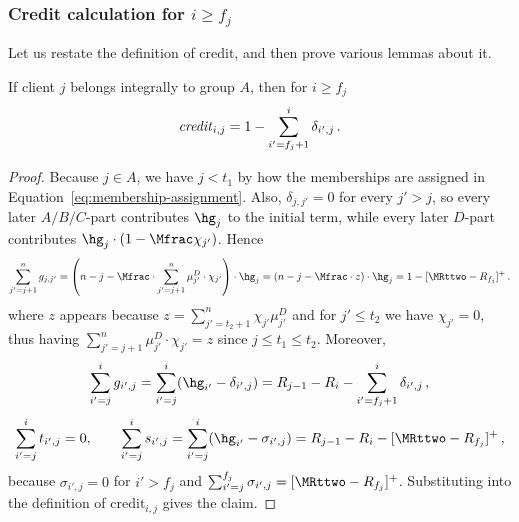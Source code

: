 \subsubsection{Credit calculation for \texorpdfstring{$i \geq f_j$}{i >=f\_j}}

Let us restate the definition of credit, and then prove various lemmas about it.


\begin{lemma}
    \label{lem:credit-A-after}
    If client $j$ belongs integrally to group $A$, then for $i \geq f_j$
    \begin{equation*}
        \text{\emph{credit}}_{i,j} = 1 - \sum_{i'=f_j+1}^i \delta_{i',j}\,.
    \end{equation*}
\end{lemma}
\begin{proof}
    Because $j \in A$, we have $j < t_1$ by how the memberships are assigned in Equation~\ref{eq:membership-assignment}. Also, $\delta_{j,j'}=0$ for every $j' > j$, so every later $A/B/C$-part contributes $\hg_j$ to the initial term, while every later $D$-part contributes $\hg_j \cdot (1-\Mfrac \chi_{j'})$. Hence
    \begin{equation*}
        \sum_{j'=j+1}^n g_{j,j'} = \left(n-j-\Mfrac \cdot \sum_{j'=j+1}^n \mu_{j'}^D \cdot \chi_{j'}\right) \cdot \hg_j =  (n-j-\Mfrac \cdot z) \cdot \hg_j = 1 - [\MRttwo - R_{f_j}]^+\,.
    \end{equation*}
    where $z$ appears because $z=\sum_{j'=t_2+1}^{n}\chi_{j'} \mu_{j'}^D$ and for $j' \le t_2$ we have $\chi_{j'}=0$, thus having $\sum_{j'=j+1}^n \mu_{j'}^D \cdot \chi_{j'} = z$ since $j \leq t_1 \leq t_2$.
    Moreover,
    \begin{equation*}
        \sum_{i'=j}^{i} g_{i',j} = \sum_{i'=j}^{i} (\hg_{i'}-\delta_{i',j}) = R_{j-1}-R_i-\sum_{i'=f_j+1}^{i} \delta_{i',j}\,,
    \end{equation*}
    \begin{equation*}
        \sum_{i'=j}^{i} t_{i',j} = 0,
        \qquad
        \sum_{i'=j}^{i} s_{i',j} = \sum_{i'=j}^{i} (\hg_{i'}-\sigma_{i',j}) = R_{j-1}-R_i-[\MRttwo-R_{f_j}]^+\,,
    \end{equation*}
    because $\sigma_{i',j}=0$ for $i'>f_j$ and $\sum_{i'=j}^{f_j} \sigma_{i',j}=[\MRttwo-R_{f_j}]^+$.
    Substituting into the definition of $\text{credit}_{i,j}$ gives the claim.
\end{proof}

